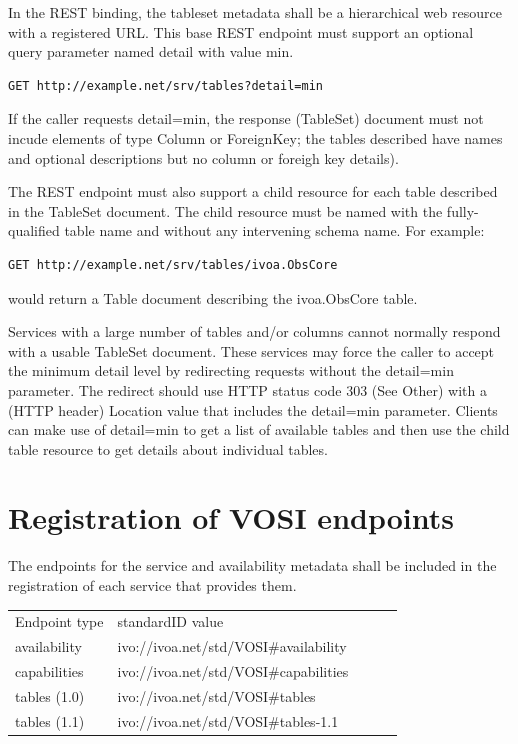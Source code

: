 \documentclass[11pt,letter]{ivoa}
\begin{document}
In the REST binding, the tableset metadata shall be a hierarchical web resource with a registered URL. This base REST endpoint must support an optional query parameter named detail with value min.

\begin{verbatim}
GET http://example.net/srv/tables?detail=min
\end{verbatim}

If the caller requests detail=min, the response (TableSet) document must not incude elements of type Column or ForeignKey; the tables described have names and optional descriptions but no column or foreigh key details).

The REST endpoint must also support a child resource for each table described in the TableSet document. The child resource must be
named with the fully-qualified table name and without any intervening schema name. For example:

\begin{verbatim}
GET http://example.net/srv/tables/ivoa.ObsCore
\end{verbatim}

would return a Table document describing the ivoa.ObsCore table.

Services with a large number of tables and/or columns cannot normally respond with a usable TableSet document. These services may
force the caller to accept the minimum detail level by redirecting requests without the detail=min parameter. The redirect should use HTTP status code 303 (See Other) with a (HTTP header) Location value that includes the detail=min parameter. Clients can make use of detail=min to get a list of available tables and then use the child table resource to get details about individual tables.
 

\section{Registration of VOSI endpoints}

The endpoints for the service and availability metadata shall be included in the registration of each service that provides them.

\begin{tabular}{l l l l l}
\label{tab:registration}
Endpoint type & standardID value \\
availability & ivo://ivoa.net/std/VOSI\#availability \\
capabilities & ivo://ivoa.net/std/VOSI\#capabilities \\
tables (1.0) & ivo://ivoa.net/std/VOSI\#tables \\
tables (1.1) & ivo://ivoa.net/std/VOSI\#tables-1.1 \\
\end{tabular}
\end{document}
